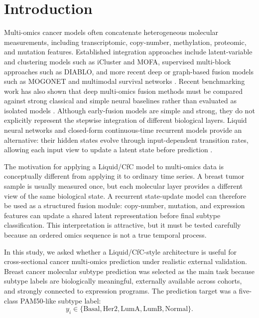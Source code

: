 \section{Introduction}

Multi-omics cancer models often concatenate heterogeneous molecular measurements, including transcriptomic, copy-number, methylation, proteomic, and mutation features. Established integration approaches include latent-variable and clustering models such as iCluster and MOFA, supervised multi-block approaches such as DIABLO, and more recent deep or graph-based fusion models such as MOGONET and multimodal survival networks \cite{shen_icluster_2009,argelaguet_mofa_2018,singh_diablo_2019,wang_mogonet_2021,valesilva_multisurv_2021}. Recent benchmarking work has also shown that deep multi-omics fusion methods must be compared against strong classical and simple neural baselines rather than evaluated as isolated models \cite{leng_benchmark_2022}. Although early-fusion models are simple and strong, they do not explicitly represent the stepwise integration of different biological layers. Liquid neural networks and closed-form continuous-time recurrent models provide an alternative: their hidden states evolve through input-dependent transition rates, allowing each input view to update a latent state before prediction \cite{hasani_ltc_2021,lechner_cfc_2022}.

The motivation for applying a Liquid/CfC model to multi-omics data is conceptually different from applying it to ordinary time series. A breast tumor sample is usually measured once, but each molecular layer provides a different view of the same biological state. A recurrent state-update model can therefore be used as a structured fusion module: copy-number, mutation, and expression features can update a shared latent representation before final subtype classification. This interpretation is attractive, but it must be tested carefully because an ordered omics sequence is not a true temporal process.

In this study, we asked whether a Liquid/CfC-style architecture is useful for cross-sectional cancer multi-omics prediction under realistic external validation. Breast cancer molecular subtype prediction was selected as the main task because subtype labels are biologically meaningful, externally available across cohorts, and strongly connected to expression programs. The prediction target was a five-class PAM50-like subtype label:
\[
y_i \in \{\mathrm{Basal}, \mathrm{Her2}, \mathrm{LumA}, \mathrm{LumB}, \mathrm{Normal}\}.
\]

